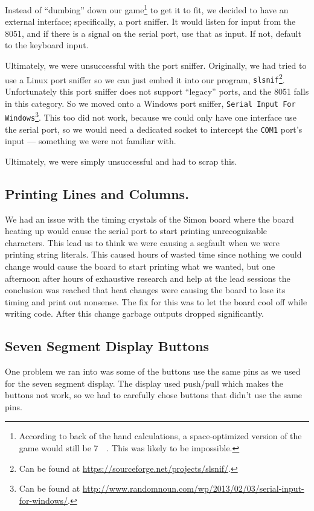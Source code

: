 \documentclass[12pt]{article}
\newcommand{\shellcmd}[1]{\texttt{\colorbox{gray!30}{#1}}}
\begin{document}
Instead of ``dumbing'' down our game\footnote{According to back of the hand calculations, a space-optimized version of the game would still be \SI{7}{\kilo\byte}. This was likely to be impossible.} to get it to fit, we decided to have an external interface; specifically, a port sniffer. It would listen for input from the \num{8051}, and if there is a signal on the serial port, use that as input. If not, default to the keyboard input.

Ultimately, we were unsuccessful with the port sniffer. Originally, we had tried to use a Linux port sniffer so we can just embed it into our program, \shellcmd{slsnif}\footnote{Can be found at \url{https://sourceforge.net/projects/slsnif/}.}. Unfortunately this port sniffer does not support ``legacy'' ports, and the \num{8051} falls in this category. So we moved onto a Windows port sniffer, \shellcmd{Serial Input For Windows}\footnote{Can be found at \url{http://www.randomnoun.com/wp/2013/02/03/serial-input-for-windows/}.}. This too did not work, because we could only have one interface use the serial port, so we would need a dedicated socket to intercept the \shellcmd{COM1} port's input --- something we were not familiar with.

Ultimately, we were simply unsuccessful and had to scrap this.

\subsection{Printing Lines and Columns.}
We had an issue with the timing crystals of the Simon board where the board heating up would cause the serial port to start printing unrecognizable characters. This lead us to think we were causing a segfault when we were printing string literals. This caused hours of wasted time since nothing we could change would cause the board to start printing what we wanted, but one afternoon after hours of exhaustive research and help at the lead sessions the conclusion was reached that heat changes were causing the board to lose its timing and print out nonsense. The fix for this was to let the board cool off while writing code. After this change garbage outputs dropped significantly.

\subsection{Seven Segment Display Buttons}
One problem we ran into was some of the buttons use the same pins as we used for the seven segment display. The display used push/pull which makes the buttons not work, so we had to carefully chose buttons that didn't use the same pins.
\end{document}
